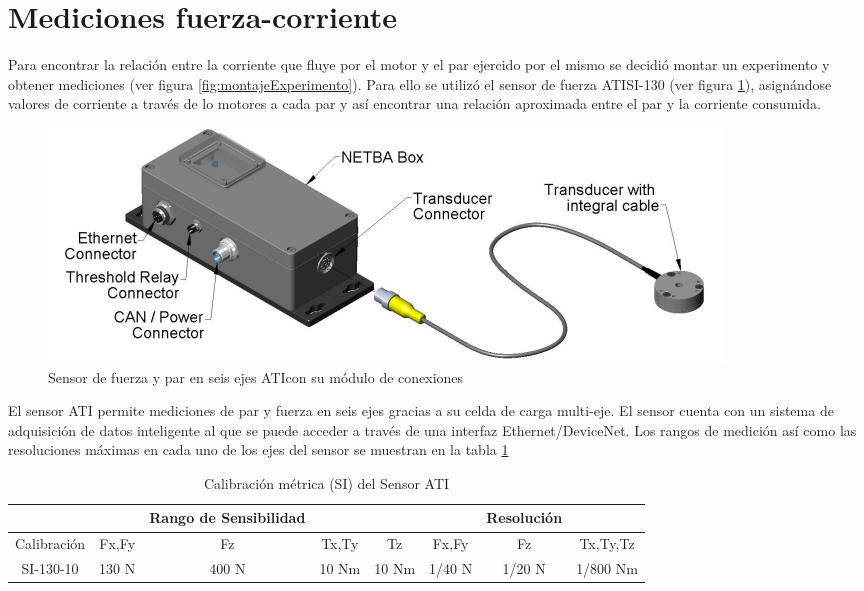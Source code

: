 %
%





\newpage
\section{Mediciones fuerza-corriente}
Para encontrar la relación entre la corriente que fluye por el motor y el par ejercido por el mismo se decidió montar un experimento y obtener mediciones (ver figura \ref{fig:montajeExperimento}). Para ello se utiliz\'o el sensor de fuerza ATI\textregistered SI-130 (ver figura \ref{fig:AtiForce2}), asignándose valores de corriente a través de lo motores a cada par y as\'i  encontrar una relación aproximada entre el par y la corriente consumida.


\begin{figure}[htb!]
\centering
\includegraphics[scale=0.7]{Figures/AtiConnection}
\caption{Sensor de fuerza y par en seis ejes ATI\textregistered con su módulo de conexiones}
\label{fig:AtiForce2}
\end{figure}

El sensor ATI \textregistered permite mediciones de par y fuerza en seis ejes gracias a su celda de carga multi-eje. El sensor cuenta con un sistema de adquisición de datos inteligente al que se puede acceder a través de una interfaz Ethernet/DeviceNet. Los rangos de medición así como las resoluciones máximas en cada uno de los ejes del sensor se muestran en la tabla \ref{tab:ati}\\

\begin{table}[htb!]
\begin{flushleft}
\begin{tabular}{ c c c c c c c c  }
& & Rango de Sensibilidad   &  &  &  &   Resolución  &\\
\hline
Calibración &	Fx,Fy &	Fz     &	Tx,Ty &	Tz	  & Fx,Fy  &	Fz	    &  Tx,Ty,Tz \\
\hline
SI-130-10	& 130 N   &	400 N  & 10 Nm  &	10 Nm  &	1/40 N &	1/20 N 	& 1/800 Nm  \\
\hline
\end{tabular}
\end{flushleft}
\caption{Calibración métrica  (SI)  del Sensor ATI}
\label{tab:ati}
\end{table}


